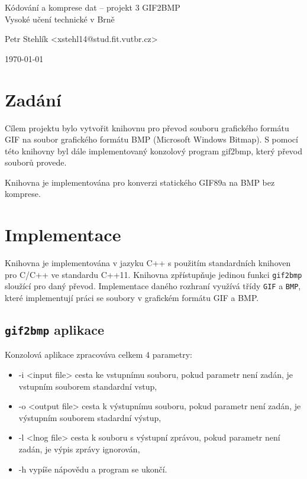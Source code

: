 \documentclass[11pt,a4paper]{article}
\begin{document}
\begin{center}
	\LARGE{Kódování a komprese dat -- projekt 3 GIF2BMP}\\
	\large{Vysoké učení technické v Brně}
	\vspace{0.5cm}

	Petr Stehlík <xstehl14@stud.fit.vutbr.cz>

	\vspace{0.5cm}

	\today

\end{center}

\section{Zadání}
Cílem projektu bylo vytvořit knihovnu pro převod souboru grafického formátu GIF na soubor grafického formátu BMP (Microsoft Windows Bitmap). S pomocí této knihovny byl dále implementovaný konzolový program gif2bmp, který převod souborů provede.

Knihovna je implementována pro konverzi statického GIF89a na BMP bez komprese.

\section{Implementace}
Knihovna je implementována v jazyku C++ s použitím standardních knihoven pro C/C++ ve standardu C++11. Knihovna zpřístupňuje jedinou funkci \texttt{gif2bmp} sloužící pro daný převod. Implementace daného rozhraní využívá třídy \texttt{GIF} a \texttt{BMP}, které implementují práci se soubory v grafickém formátu GIF a BMP.

\subsection{\texttt{gif2bmp} aplikace}

Konzolová aplikace zpracováva celkem 4 parametry:

\begin{itemize}
	\item{-i <input file> cesta ke vstupnímu souboru, pokud parametr není zadán, je vstupním souborem standardní vstup,}
	\item{-o <output file> cesta k výstupnímu souboru, pokud parametr není zadán, je výstupním souborem stadardní výstup,}
	\item{-l <lnog file> cesta k souboru s výstupní zprávou, pokud parametr není zadán, je výpis zprávy ignorován,}
	\item{-h vypíše nápovědu a program se ukončí.}
\end{itemize}
\end{document}
